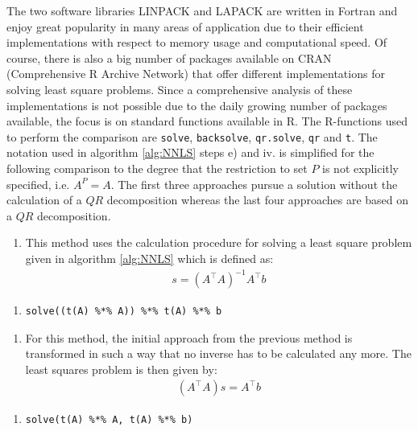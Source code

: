 The two software libraries LINPACK and LAPACK are written in Fortran and enjoy great popularity in many areas of application due to their efficient implementations with respect to memory usage and computational speed. Of course, there is also a big number of packages available on CRAN (Comprehensive R Archive Network) that offer different implementations for solving least square problems. Since a comprehensive analysis of these implementations is not possible due to the daily growing number of packages available, the focus is on standard functions available in \textsf{R}. The \textsf{R}-functions used to perform the comparison are \texttt{solve}, \texttt{backsolve}, \texttt{qr.solve}, \texttt{qr} and \texttt{t}. The notation used in algorithm \ref{alg:NNLS} steps e) and iv. is simplified for the following comparison to the degree that the restriction to set $P$ is not explicitly specified, i.e. $A^P = A$. The first three approaches pursue a solution without the calculation of a $QR$ decomposition whereas the last four approaches are based on a $QR$ decomposition. 


\begin{enumerate}[label={\bfseries Method \arabic*:}, leftmargin=*, labelindent=1em, series = quest]
	\item This method uses the calculation procedure for solving a least square problem given in algorithm \ref{alg:NNLS} which is defined as: 
	\begin{align*}
		s = (A^\top A)^{-1} A^\top b
	\end{align*}
\end{enumerate}

\begin{enumerate}[series = inform]
	\item[] \begin{lstlisting}[otherkeywords={\%*\%}, numbers=none]
			solve((t(A) %*% A)) %*% t(A) %*% b
			\end{lstlisting}
\end{enumerate}


\begin{enumerate}[resume*=quest]
	\item For this method, the initial approach from the previous method is transformed in such a way that no inverse has to be calculated any more. The least squares problem is then given by:  
	\begin{align*}
		(A^\top A)s =  A^\top b
	\end{align*}
\end{enumerate}
\begin{enumerate}[resume*=inform]
	\item[] \begin{lstlisting}[otherkeywords={\%*\%}, numbers=none]
			solve(t(A) %*% A, t(A) %*% b)
			\end{lstlisting}
\end{enumerate}


